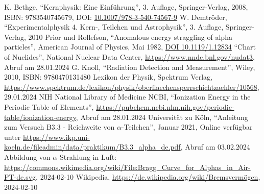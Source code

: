 \documentclass[12pt,a4paper]{scrartcl}
\numberwithin{equation}{section} %
\renewcommand{\[}{} %
\renewcommand{\]}{\noindent} %
\begin{document}
\begin{thebibliography}{99}
	K. Bethge, ``Kernphysik: Eine Einführung'', 3. Auflage,
	Springer-Verlag, 2008, ISBN: 9783540745679, DOI:
	\href{https://doi.org/10.1007/978-3-540-74567-9}{10.1007/978-3-540-74567-9}
	W. Demtröder, ``Experimentalphysik 4. Kern-, Teilchen und
	Astrophysik'', 3. Auflage, Springer-Verlag, 2010
	Prior und Rollefson, ``Anomalous energy straggling of alpha
	particles'', American Journal of Physics, Mai 1982,
	\href{https://doi.org/10.1119/1.12834}{DOI 10.1119/1.12834}
	``Chart of Nuclides'', National Nuclear Data Center,
	\url{https://www.nndc.bnl.gov/nudat3}, Abruf am 28.01.2024
	G. Knoll, ``Radiation Detection and Measurement'', Wiley, 2010, ISBN:
	9780470131480
\bibitem{Spektrum]}
	Lexikon der Physik, Spektrum Verlag,
	\url{https://www.spektrum.de/lexikon/physik/oberflaechensperrschichtzaehler/10568},
	29.01.2024
	NIH National Library of Medicine NCBI, ``Ionization Energy in the
	Periodic Table of Elements'',
	\url{https://pubchem.ncbi.nlm.nih.gov/periodic-table/ionization-energy},
	Abruf am 28.01.2024
	Universität zu Köln, ``Anleitung zum Versuch B3.3 - Reichweite von
	$\alpha$-Teilchen'', Januar 2021, Online verfügbar unter
	\url{https://www.ikp.uni-koeln.de/fileadmin/data/praktikum/B3.3_alpha_de.pdf},
	Abruf am 03.02.2024
	Abbildung von $\alpha$-Strahlung in Luft: \url{https://commons.wikimedia.org/wiki/File:Bragg_Curve_for_Alphas_in_Air-PT-de.svg}, 2024-02-10
	Wikipedia, \url{https://de.wikipedia.org/wiki/Bremsvermögen}, 2024-02-10
\end{thebibliography}
\end{document}
